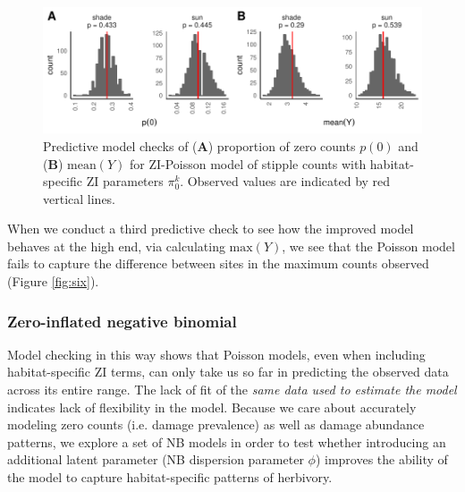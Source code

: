 \documentclass[11pt, oneside]{amsart}
\begin{document}
\begin{figure}[!ht]
\begin{center}
\includegraphics[scale = 0.8]{POIS_stip2_pp}
\caption{Predictive model checks of (\textbf{A}) proportion of zero counts $p(0)$ and (\textbf{B}) $\text{mean}(Y)$ for ZI-Poisson model of stipple counts with habitat-specific ZI parameters $\pi^{k}_0$. Observed values are indicated by red vertical lines.}
\label{fig:five}
\end{center}
\end{figure}

When we conduct a third predictive check to see how the improved model behaves at the high end, via calculating $\text{max}(Y)$, we see that the Poisson model fails to capture the difference between sites in the maximum counts observed (Figure \ref{fig:six}). 





\subsubsection{Zero-inflated negative binomial}

Model checking in this way shows that Poisson models, even when including habitat-specific ZI terms, can only take us so far in predicting the observed data across its entire range. The lack of fit of the \emph{same data used to estimate the model} indicates lack of flexibility in the model. Because we care about accurately modeling zero counts (i.e. damage prevalence) as well as damage abundance patterns, we explore a set of NB models in order to test whether introducing an additional latent parameter (NB dispersion parameter $\phi$) improves the ability of the model to capture habitat-specific patterns of herbivory.
\end{document}
